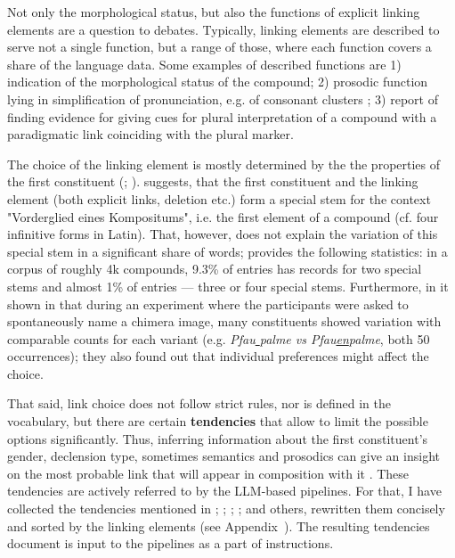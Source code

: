 \documentclass[11pt]{article}
\begin{document}
Not only the morphological status, but also the functions of explicit linking elements are a question to debates. Typically, linking elements are described to serve not a single function, but a range of those, where each function covers a share of the language data. Some examples of described functions are 1) indication of the morphological status of the compound; 2) prosodic function lying in simplification of pronunciation, e.g. of consonant clusters \cite{Schlucker2022}; 3) \citealt{schafer_2018_1323211} report of finding evidence for giving cues for plural interpretation of a compound with a paradigmatic link coinciding with the plural marker.

The choice of the linking element is mostly determined by the the properties of the first constituent (\citealt[227]{eisenberg2016grundriss}; \citealt{schafer_2018_1323211}). \citet{fuhrhop1998grenzfalle} suggests, that the first constituent and the linking element (both explicit links, deletion etc.) form a special stem for the context "Vorderglied eines Kompositums", i.e. the first element of a compound (cf. four infinitive forms in Latin). That, however, does not explain the variation of this special stem in a significant share of words; \citet{Augst1975} provides the following statistics: in a corpus of roughly 4k compounds, 9.3\% of entries has records for two special stems and almost 1\% of entries --- three or four special stems. Furthermore, in it shown in \citet{NeefBorgwaldt+2012+27+56} that during an experiment where the participants were asked to spontaneously name a chimera image, many constituents showed variation with comparable counts for each variant (e.g. \textit{Pfau\underline{ }palme vs Pfau\underline{en}palme}, both 50 occurrences); they also found out that individual preferences might affect the choice.

That said, link choice does not follow strict rules, nor is defined in the vocabulary, but there are certain \textbf{tendencies} that allow to limit the possible options significantly. Thus, inferring information about the first constituent's gender, declension type, sometimes semantics and prosodics can give an insight on the most probable link that will appear in composition with it \cite{Schlucker2022, schafer_2018_1323211}. These tendencies are actively referred to by the LLM-based pipelines. For that, I have collected the tendencies mentioned in \citealt[227-231]{eisenberg2016grundriss}; \citealt[228-231]{Schafer2018:a}; \citealt{schafer_2018_1323211}; \citealt{NeefBorgwaldt+2012+27+56}; and others, rewritten them concisely and sorted by the linking elements (see Appendix~). The resulting tendencies document is input to the pipelines as a part of instructions.
\end{document}
